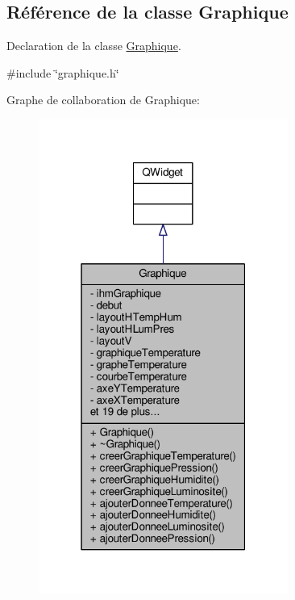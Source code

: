 \hypertarget{class_graphique}{}\subsection{Référence de la classe Graphique}
\label{class_graphique}


Declaration de la classe \hyperlink{class_graphique}{Graphique}.  




{\ttfamily \#include \char`\"{}graphique.\+h\char`\"{}}



Graphe de collaboration de Graphique\+:\nopagebreak
\begin{figure}[H]
\begin{center}
\leavevmode
\includegraphics[width=232pt]{class_graphique__coll__graph}
\end{center}
\end{figure}
